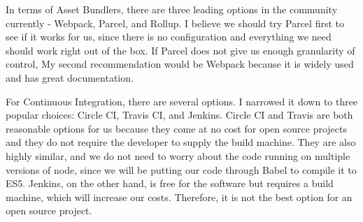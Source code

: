\documentclass[onecolumn, draftclsnofoot,10pt, compsoc]{IEEEtran}
\begin{document}
In terms of Asset Bundlers, there are three leading options in the community currently - Webpack, Parcel, and Rollup. I believe we should try Parcel first to see if it works for us, since there is no configuration and everything we need should work right out of the box. If Parcel does not give us enough granularity of control, My second recommendation would be Webpack because it is widely used and has great documentation.

For Continuous Integration, there are several options. I narrowed it down to three popular choices: Circle CI, Travis CI, and Jenkins. Circle CI and Travis are both reasonable options for us because they come at no cost for open source projects and they do not require the developer to supply the build machine. They are also highly similar, and we do not need to worry about the code running on multiple versions of node, since we will be putting our code through Babel to compile it to ES5. Jenkins, on the other hand, is free for the software but requires a build machine, which will increase our costs. Therefore, it is not the best option for an open source project.



\end{document}
